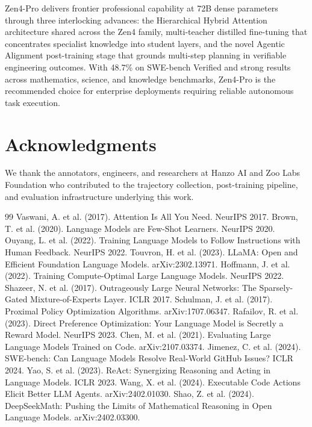 \documentclass[11pt,a4paper]{article}
\begin{document}
Zen4-Pro delivers frontier professional capability at 72B dense parameters through three
interlocking advances: the Hierarchical Hybrid Attention architecture shared across the
Zen4 family, multi-teacher distilled fine-tuning that concentrates specialist knowledge
into student layers, and the novel Agentic Alignment post-training stage that grounds
multi-step planning in verifiable engineering outcomes. With 48.7\% on SWE-bench Verified
and strong results across mathematics, science, and knowledge benchmarks, Zen4-Pro is the
recommended choice for enterprise deployments requiring reliable autonomous task execution.

\section*{Acknowledgments}

We thank the annotators, engineers, and researchers at Hanzo AI and Zoo Labs Foundation
who contributed to the trajectory collection, post-training pipeline, and evaluation
infrastructure underlying this work.

\begin{thebibliography}{99}
 Vaswani, A. et al. (2017). Attention Is All You Need. NeurIPS 2017.
 Brown, T. et al. (2020). Language Models are Few-Shot Learners. NeurIPS 2020.
 Ouyang, L. et al. (2022). Training Language Models to Follow Instructions with Human Feedback. NeurIPS 2022.
 Touvron, H. et al. (2023). LLaMA: Open and Efficient Foundation Language Models. arXiv:2302.13971.
 Hoffmann, J. et al. (2022). Training Compute-Optimal Large Language Models. NeurIPS 2022.
 Shazeer, N. et al. (2017). Outrageously Large Neural Networks: The Sparsely-Gated Mixture-of-Experts Layer. ICLR 2017.
 Schulman, J. et al. (2017). Proximal Policy Optimization Algorithms. arXiv:1707.06347.
 Rafailov, R. et al. (2023). Direct Preference Optimization: Your Language Model is Secretly a Reward Model. NeurIPS 2023.
 Chen, M. et al. (2021). Evaluating Large Language Models Trained on Code. arXiv:2107.03374.
 Jimenez, C. et al. (2024). SWE-bench: Can Language Models Resolve Real-World GitHub Issues? ICLR 2024.
 Yao, S. et al. (2023). ReAct: Synergizing Reasoning and Acting in Language Models. ICLR 2023.
 Wang, X. et al. (2024). Executable Code Actions Elicit Better LLM Agents. arXiv:2402.01030.
 Shao, Z. et al. (2024). DeepSeekMath: Pushing the Limits of Mathematical Reasoning in Open Language Models. arXiv:2402.03300.
\end{thebibliography}
\end{document}
